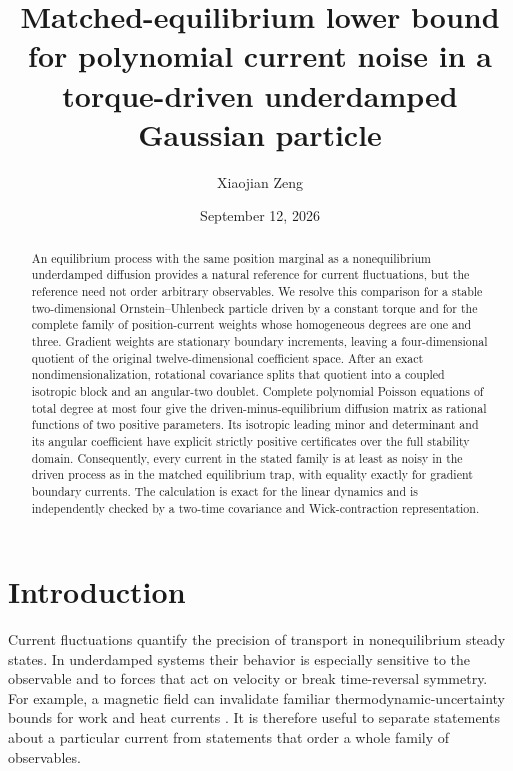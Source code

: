 \documentclass[aps,pre,reprint,amsmath,amssymb,superscriptaddress,nofootinbib]{revtex4-2}
\begin{document}
\title{Matched-equilibrium lower bound for polynomial current noise in a torque-driven underdamped Gaussian particle}

\author{Xiaojian Zeng}

\date{September 12, 2026}

\begin{abstract}
An equilibrium process with the same position marginal as a nonequilibrium
underdamped diffusion provides a natural reference for current fluctuations,
but the reference need not order arbitrary observables.  We resolve this
comparison for a stable two-dimensional Ornstein--Uhlenbeck particle driven by
a constant torque and for the complete family of position-current weights
whose homogeneous degrees are one and three.  Gradient weights are stationary
boundary increments, leaving a four-dimensional quotient of the original
twelve-dimensional coefficient space.  After an exact nondimensionalization,
rotational covariance splits that quotient into a coupled isotropic block and
an angular-two doublet.  Complete polynomial Poisson equations of total degree
at most four give the driven-minus-equilibrium diffusion matrix as rational
functions of two positive parameters.  Its isotropic leading minor and
determinant and its angular coefficient have explicit strictly positive
certificates over the full stability domain.  Consequently, every current in
the stated family is at least as noisy in the driven process as in the matched
equilibrium trap, with equality exactly for gradient boundary currents.  The
calculation is exact for the linear dynamics and is independently checked by a
two-time covariance and Wick-contraction representation.
\end{abstract}

\maketitle

\section{Introduction}
\label{sec:introduction}

Current fluctuations quantify the precision of transport in nonequilibrium
steady states.  In underdamped systems their behavior is especially sensitive
to the observable and to forces that act on velocity or break time-reversal
symmetry.  For example, a magnetic field can invalidate familiar
thermodynamic-uncertainty bounds for work and heat currents
\cite{ChunFischerSeifert2019}.  It is therefore useful to separate statements
about a particular current from statements that order a whole family of
observables.
\end{document}
